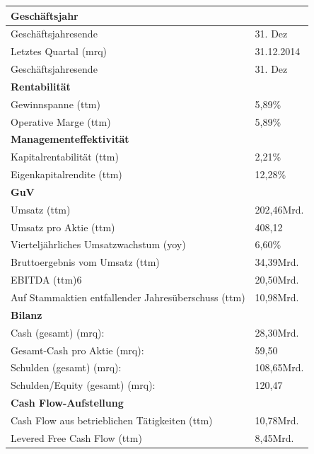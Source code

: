 \documentclass[12pt]{article}
\begin{document}
\begin{table}[h]
\begin{tabular}{|p{}|p{}|}
\hline
\textbf{Geschäftsjahr}  & \\  \hline
Geschäftsjahresende &   31. Dez \\  
Letztes Quartal (mrq) &   31.12.2014 \\  
Geschäftsjahresende &   31. Dez \\  \hline
\textbf{Rentabilität}  & \\  \hline
 Gewinnspanne (ttm)&   5,89\% \\  
 Operative Marge (ttm)&	5,89\%    \\ \hline
 \textbf{Managementeffektivität}  & \\  \hline
Kapitalrentabilität (ttm) & 2,21\%  \\  
Eigenkapitalrendite (ttm) &   12,28\%  \\  \hline
 \textbf{GuV}  & \\  \hline

 Umsatz (ttm)&   202,46Mrd. \\  
 Umsatz pro Aktie (ttm)&  408,12  \\  
 
Vierteljährliches Umsatzwachstum (yoy)&   6,60\% \\  
 Bruttoergebnis vom Umsatz (ttm)&34,39Mrd.    \\  
EBITDA (ttm)6 &  20,50Mrd.  \\  
 Auf Stammaktien entfallender Jahresüberschuss (ttm) &  10,98Mrd.  \\  \hline
  \textbf{Bilanz}  & \\  \hline


Cash (gesamt) (mrq): &  	28,30Mrd.  \\  

Gesamt-Cash pro Aktie (mrq): & 59,50   \\  
Schulden (gesamt) (mrq): &   108,65Mrd. \\  
 Schulden/Equity (gesamt) (mrq):&  	120,47  \\  \hline
   \textbf{Cash Flow-Aufstellung}  & \\  \hline

Cash Flow aus betrieblichen Tätigkeiten (ttm) &  10,78Mrd.  \\  
Levered Free Cash Flow (ttm) &  8,45Mrd.  \\  \hline

\end{tabular}
\end{table}
\cite{yahoofinanzenvw}
\end{document}
